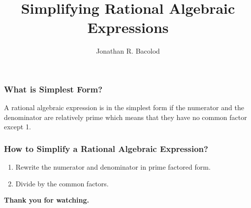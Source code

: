 \documentclass[14pt]{beamer}
\title[] {Simplifying Rational Algebraic Expressions}
\author{Jonathan R. Bacolod}
\institute[SHS]{Sauyo High School}
\date{}
\begin{document}
	\frame{\titlepage}
	
	\begin{frame}
		\frametitle{What is Simplest Form?}
		A rational algebraic expression is in the simplest form if the
		numerator and the denominator are relatively prime which means that they have no common factor except 1.
		  
	\end{frame}

    \begin{frame}
    	\frametitle{How to Simplify a Rational Algebraic Expression?}
    	\begin{enumerate}
    		\item<1-> Rewrite the numerator and denominator in prime factored form.
    		\item<2-> Divide by the common factors.
       	\end{enumerate}
    \end{frame}
	
    \begin{frame}
    	\begin{center}
    		\textbf{\LARGE Thank you for watching.}
    	\end{center}
    \end{frame}
	
\end{document}
